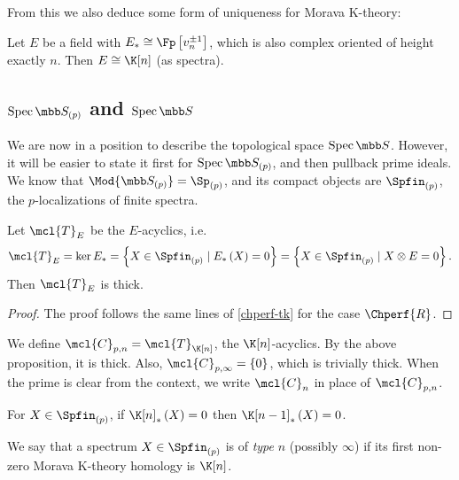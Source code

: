 From this we also deduce some form of uniqueness for Morava K-theory:

\begin{corollary}
	Let $E$ be a field with $E_* \cong \Fp\left[v_n^{\pm 1}\right]$, which is also complex oriented of height exactly $n$.
	Then $E \cong \K[n]$ (as spectra).
\end{corollary}



\subsection{\texorpdfstring{$\spec \SS_{\left(p\right)}$}{spec S(p)} and \texorpdfstring{$\spec \SS$}{spec S}}

We are now in a position to describe the topological space $\spec \SS$.
However, it will be easier to state it first for $\spec \SS_{\left(p\right)}$, and then pullback prime ideals.
We know that $\Mod{\SS_{\left(p\right)}} = \Sp_{\left(p\right)}$, and its compact objects are $\Spfin_{\left(p\right)}$, the $p$-localizations of finite spectra.

\begin{proposition}\label{T_E-thick}
	Let $\mcl{T}_E$ be the $E$-acyclics, i.e.
	$$
	\mcl{T}_E
	= \ker E_*
	= \left\{ X \in \Spfin_{\left(p\right)} \mid E_*\left(X\right)=0 \right\}
	= \left\{ X \in \Spfin_{\left(p\right)} \mid X \otimes E=0 \right\}.
	$$
	Then $\mcl{T}_E$ is thick.
\end{proposition}

\begin{proof}
	The proof follows the same lines of \ref{chperf-tk} for the case $\Chperf{R}$.
\end{proof}

\begin{definition}
	We define $\mcl{C}_{p, n} = \mcl{T}_{\K[n]}$, the $\K[n]$-acyclics.
	By the above proposition, it is thick.
	Also, $\mcl{C}_{p, \infty} = \left\{ 0\right\}$, which is trivially thick.
	When the prime is clear from the context, we write $\mcl{C}_n$ in place of $\mcl{C}_{p, n}$.
\end{definition}

\begin{proposition}
	For $X \in \Spfin_{\left(p\right)}$, if $\K[n]_*\left(X\right) = 0$ then $\K[n-1]_*\left(X\right) = 0$.
\end{proposition}

\begin{definition}
	We say that a spectrum $X \in \Spfin_{\left(p\right)}$ is of \emph{type} $n$ (possibly $\infty$) if its first non-zero Morava K-theory homology is $\K[n]$.
\end{definition}

